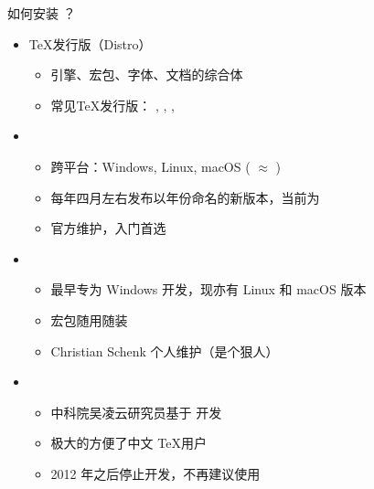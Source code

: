 \begin{frame}{如何安装 ？}
  \begin{itemize}
    \item \TeX{}发行版（Distro）
          \begin{itemize}
            \item 引擎、宏包、字体、文档的综合体
            \item 常见\TeX{}发行版：
                  \alert{\TL}, \MacTeX, \MiKTeX, \CTeX
          \end{itemize}
    \item \TL
          \begin{itemize}
            \item 跨平台：Windows, Linux, macOS (\MacTeX{} $\approx$ \TL)
            \item 每年四月左右发布以年份命名的新版本，当前为 
            \item 官方维护，入门首选
          \end{itemize}
    \item \MiKTeX
          \begin{itemize}
            \item 最早专为 Windows 开发，现亦有 Linux 和 macOS 版本
            \item 宏包随用随装
            \item Christian Schenk 个人维护（是个狠人）
          \end{itemize}
    \item \CTeX
          \begin{itemize}
            \item 中科院吴凌云研究员基于 \MiKTeX 开发
            \item 极大的方便了中文 \TeX 用户
            \item 2012 年之后停止开发，\alert{不再建议}使用
          \end{itemize}
  \end{itemize}
\end{frame}

